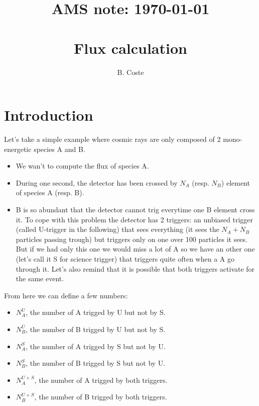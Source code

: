 \documentclass[fleqn,twoside]{article}
\begin{document}
\title{
  AMS note: \today \\
  \hspace{1cm} \\
  Flux calculation
}

\author{
  B. Coste\address[Trento]{INFN, Istituto Nazionale di Fisica Nucleare, Trento, Italia}
}

\maketitle


\section{Introduction}
Let's take a simple example where cosmic rays are only composed of 2 mono-energetic species A and B.
\begin{itemize}
\item We wan't to compute the flux of species A.
\item During one second, the detector has been crossed by $N_{A}$ (resp. $N_{B}$) element of species A (resp. B).
\item B is so abundant that the detector cannot trig everytime one B element cross it. To cope with this problem the detector has 2 triggers:
  an unbiased trigger (called U-trigger in the following) that sees everything (it sees the $N_{A}+N_{B}$ particles passing trough) but triggers only on one over 100 particles it sees. But if we had only this one we would miss a lot of A so we have an other one (let's call it S for science trigger) that triggers quite often when a A go through it. Let's also remind that it is possible that both triggers activate for the same event.
\end{itemize}

From here we can define a few numbers:
\begin{itemize}
\item $N_{A}^{U}$, the number of A trigged by U but not by S.
\item $N_{B}^{U}$, the number of B trigged by U but not by S.
\item $N_{A}^{S}$, the number of A trigged by S but not by U.
\item $N_{B}^{S}$, the number of B trigged by S but not by U.
\item $N_{A}^{U+S}$, the number of A trigged by both triggers.
\item $N_{B}^{U+S}$, the number of B trigged by both triggers.
\end{itemize}
\end{document}
